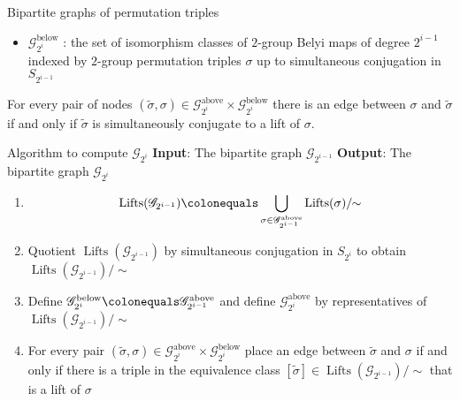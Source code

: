 \documentclass[xcolor=dvipsnames]{beamer}
\theoremstyle{plain}
\newcommand{\wt}[1]{\widetilde{#1}}
\DeclareMathOperator{\Lifts}{Lifts}
\begin{document}
{\begin{frame}{Bipartite graphs of permutation triples}
\begin{itemize}
          $\wt{\sigma}$ up to simultaneous conjugation
          in $S_{2^i}$
        \item
          $\mathscr{G}_{2^i}^\text{below}$ :
          the set of isomorphism classes of $2$-group Belyi maps
          of degree $2^{i-1}$
          indexed by $2$-group permutation triples
          $\sigma$ up to simultaneous conjugation
          in $S_{2^{i-1}}$
      \end{itemize}
      \pause
      For every pair of nodes
      $(\wt{\sigma},\sigma)\in
      \mathscr{G}_{2^i}^\text{above}\times
      \mathscr{G}_{2^i}^\text{below}$
      there is an edge between
      $\sigma$ and $\wt{\sigma}$
      if and only if $\wt{\sigma}$ is
      simultaneously conjugate to a lift of
      $\sigma$.
    \end{frame}
    \begin{frame}{Algorithm to compute $\mathscr{G}_{2^i}$}
      \textbf{Input}:
      The bipartite graph $\mathscr{G}_{2^{i-1}}$
      \newline
      \textbf{Output}:
      The bipartite graph $\mathscr{G}_{2^{i}}$
      \pause\par
      \begin{enumerate}
        \item
          \[
            \Lifts(\mathscr{G}_{2^{i-1}})
            \colonequals
            \bigcup_{\sigma\in\mathscr{G}_{2^{i-1}}^\text{above}}\Lifts(\sigma)/\!\!\sim
          \]
        \item\pause
          Quotient
          $\Lifts(\mathscr{G}_{2^{i-1}})$
          by simultaneous conjugation in $S_{2^i}$
          to obtain
          $\Lifts(\mathscr{G}_{2^{i-1}})/\!\!\sim$
        \item\pause
          Define $\mathscr{G}_{2^i}^\text{below}\colonequals
          \mathscr{G}_{2^{i-1}}^\text{above}$
          and define
          $\mathscr{G}_{2^i}^\text{above}$
          by representatives of
          $\Lifts(\mathscr{G}_{2^{i-1}})/\!\!\sim$
        \item\pause
          For every pair
          $(\wt{\sigma},\sigma)\in
          \mathscr{G}_{2^i}^\text{above}
          \times
          \mathscr{G}_{2^i}^\text{below}$
          place an edge between
          $\wt{\sigma}$ and $\sigma$
          if and only if there is a triple in
          the equivalence class
          $[\wt{\sigma}]\in
          \Lifts(\mathscr{G}_{2^{i-1}})/\!\!\sim$
          that is a lift of $\sigma$
      \end{enumerate}
    \end{frame}
}
\end{document}

